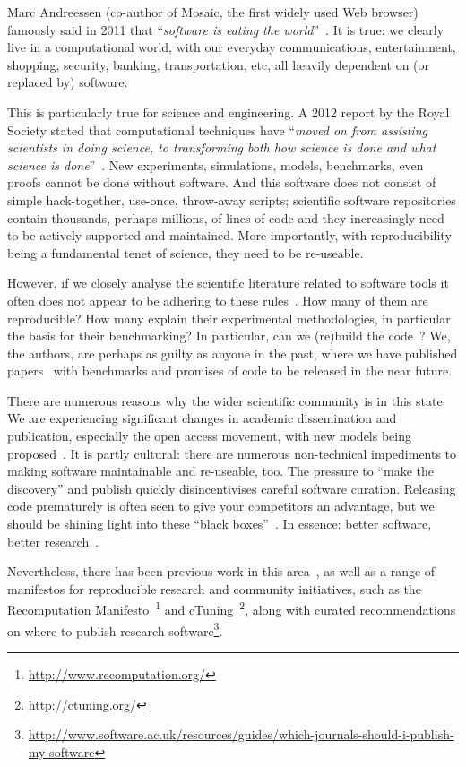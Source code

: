 \documentclass[10pt,conference,final]{IEEEtran}
\begin{document}
Marc Andreessen (co-author of Mosaic, the first widely used Web
browser) famously said in 2011 that ``{\emph{software is eating the
world}}''~\cite{andreessen:2011}. It is true: we clearly live in a
computational world, with our everyday communications, entertainment,
shopping, security, banking, transportation, etc, all heavily
dependent on (or replaced by) software.

This is particularly true for science and engineering. A 2012 report
by the Royal Society stated that computational techniques have
``{\emph{moved on from assisting scientists in doing science, to
transforming both how science is done and what science is
done}}''~\cite{rssaaoe:2012}. New experiments, simulations, models,
benchmarks, even proofs cannot be done without software. And this
software does not consist of simple hack-together, use-once,
throw-away scripts; scientific software repositories contain
thousands, perhaps millions, of lines of code and they increasingly
need to be actively supported and maintained. More importantly, with
reproducibility being a fundamental tenet of science, they need to be
re-useable.

However, if we closely analyse the scientific literature related to
software tools it often does not appear to be adhering to these
rules~\cite{nature:2011}. How many of them are reproducible? How many
explain their experimental methodologies, in particular the basis for
their benchmarking? In particular, can we (re)build the
code~\cite{collberg-et-al:2014}? We, the authors, are perhaps as
guilty as anyone in the past, where we have published
papers~\cite{crick-et-al:2009a,Berdine2011SLAyer} with benchmarks and
promises of code to be released in the near future.

There are numerous reasons why the wider scientific community is in
this state. We are experiencing significant changes in academic
dissemination and publication, especially the open access movement,
with new models being
proposed~\cite{stodden-et-al:2013,fursin+dubach:2014}. It is partly
cultural: there are numerous non-technical impediments to making
software maintainable and re-useable, too. The pressure to ``make the
discovery'' and publish quickly disincentivises careful software
curation. Releasing code prematurely is often seen to give your
competitors an advantage, but we should be shining light into these
``black boxes''~\cite{morin-et-al:2012}. In essence: better software,
better research~\cite{goble:2014}.

Nevertheless, there has been previous work in this
area~\cite{sim-et-al:2003,chirigati-et-al:2013}, as well as a range of
manifestos for reproducible research and community initiatives, such
as the Recomputation
Manifesto~\cite{gent:2013}\footnote{\url{http://www.recomputation.org/}}
and
cTuning~\cite{fursin-et-al:2014}\footnote{\url{http://ctuning.org/}},
along with curated recommendations on where to publish research
software\footnote{\url{http://www.software.ac.uk/resources/guides/which-journals-should-i-publish-my-software}}.
\end{document}
